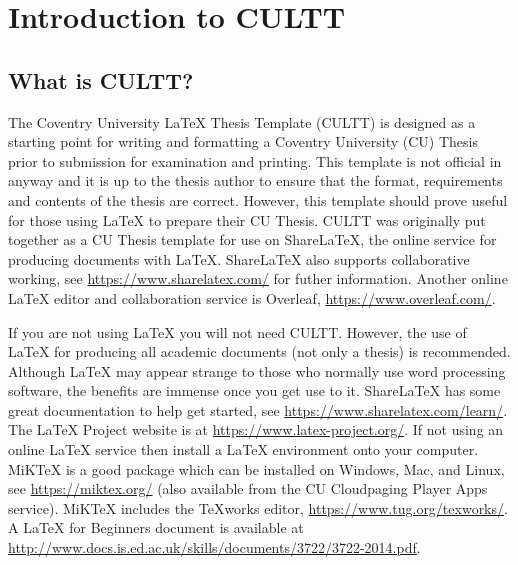 
\chapter{Introduction to CULTT}  %

\ifpdf
    \graphicspath{{Chapter1/Figs/Raster/}{Chapter1/Figs/PDF/}{Chapter1/Figs/}}
\else
    \graphicspath{{Chapter1/Figs/Vector/}{Chapter1/Figs/}}
\fi

\section{What is CULTT?} %

The Coventry University \LaTeX{} Thesis Template (CULTT) is designed as a starting point for writing and formatting a Coventry University (CU) Thesis prior to submission for examination and printing. This template is not official in anyway and it is up to the thesis author to ensure that the format, requirements and contents of the thesis are correct. However, this template should prove useful for those using \LaTeX{} to prepare their CU Thesis. CULTT was originally put together as a CU Thesis template for use on ShareLaTeX, the online service for producing documents with \LaTeX{}. ShareLaTeX also supports collaborative working, see \url{https://www.sharelatex.com/} for futher information. Another online \LaTeX{} editor and collaboration service is Overleaf, \url{https://www.overleaf.com/}.

If you are not using \LaTeX{} you will not need CULTT. However, the use of \LaTeX{} for producing all academic documents (not only a thesis) is recommended. Although \LaTeX{} may appear strange to those who normally use word processing software, the benefits are immense once you get use to it. ShareLaTeX has some great documentation to help get started, see \url{https://www.sharelatex.com/learn/}. The \LaTeX{} Project website is at \url{https://www.latex-project.org/}. If not using an online \LaTeX{} service then install a \LaTeX{} environment onto your computer. MiKTeX is a good package which can be installed on Windows, Mac, and Linux, see \url{https://miktex.org/} (also available from the CU Cloudpaging Player Apps service). MiKTeX includes the TeXworks editor, \url{https://www.tug.org/texworks/}. A \LaTeX{} for Beginners document is available at \url{http://www.docs.is.ed.ac.uk/skills/documents/3722/3722-2014.pdf}.

